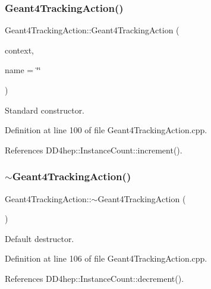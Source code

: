 \subsubsection{\texorpdfstring{Geant4\+Tracking\+Action()}{Geant4TrackingAction()}}
{\footnotesize\ttfamily Geant4\+Tracking\+Action\+::\+Geant4\+Tracking\+Action (\begin{DoxyParamCaption}\item[{\hyperlink{class_d_d4hep_1_1_simulation_1_1_geant4_context}{Geant4\+Context} $\ast$}]{context,  }\item[{const std\+::string \&}]{name = {\ttfamily \char`\"{}\char`\"{}} }\end{DoxyParamCaption})}



Standard constructor. 



Definition at line 100 of file Geant4\+Tracking\+Action.\+cpp.



References D\+D4hep\+::\+Instance\+Count\+::increment().

\hypertarget{class_d_d4hep_1_1_simulation_1_1_geant4_tracking_action_a2647e6b8f311448fa99c20c487df3782}{}\label{class_d_d4hep_1_1_simulation_1_1_geant4_tracking_action_a2647e6b8f311448fa99c20c487df3782} 
\subsubsection{\texorpdfstring{$\sim$\+Geant4\+Tracking\+Action()}{~Geant4TrackingAction()}}
{\footnotesize\ttfamily Geant4\+Tracking\+Action\+::$\sim$\+Geant4\+Tracking\+Action (\begin{DoxyParamCaption}{ }\end{DoxyParamCaption})\hspace{0.3cm}{\ttfamily [virtual]}}



Default destructor. 



Definition at line 106 of file Geant4\+Tracking\+Action.\+cpp.



References D\+D4hep\+::\+Instance\+Count\+::decrement().



